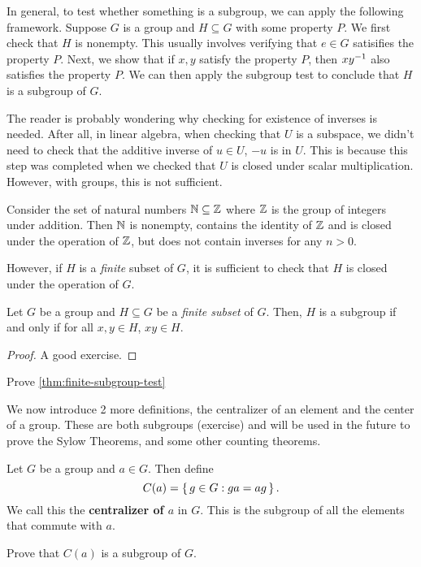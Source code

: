 \documentclass[./main.tex]{subfiles}
\begin{document}
In general, to test whether something is a subgroup, we can apply the following
framework. Suppose $G$ is a group and $H \subseteq G$ with some property $P$. We
first check that $H$ is nonempty. This usually involves verifying that $e \in G$
satisifies the property $P$. Next, we show that if $x, y$ satisfy the property
$P$, then $xy^{-1}$ also satisfies the property $P$. We can then apply the
subgroup test to conclude that $H$ is a subgroup of $G$. 

The reader is probably wondering why checking for existence of inverses is
needed. After all, in linear algebra, when checking that $U$ is a subspace, we
didn't need to check that the additive inverse of $u \in U$, $-u$ is in $U$.
This is because this step was completed when we checked that $U$ is closed under
scalar multiplication. However, with groups, this is not sufficient.

\begin{example}
Consider the set of natural numbers $\mathbb{N} \subseteq \mathbb{Z}$ where $\mathbb{Z}$ is
the group of integers under addition. Then $\mathbb{N}$ is nonempty, contains the
identity of $\mathbb{Z}$ and is closed under the operation of $\mathbb{Z}$, but does not
contain inverses for any $n > 0$.
\end{example}

However, if $H$ is a \emph{finite} subset of $G$, it is sufficient to check that
$H$ is closed under the operation of $G$. 
\begin{theorem}
\label{thm:finite-subgroup-test}
    Let $G$ be a group and $H \subseteq G$ be a \emph{finite subset} of $G$.
    Then, $H$ is a subgroup if and only if for all $x,y \in H$, $xy \in H$.
\end{theorem}
\begin{proof}
    A good exercise.
\end{proof}
\begin{exercise}
    Prove \cref{thm:finite-subgroup-test}
\end{exercise}

We now introduce 2 more definitions, the centralizer of an element and the
center of a group. These are both subgroups (exercise) and will be used in the
future to prove the Sylow Theorems, and some other counting theorems.

\begin{definition}[Centralizer]
    Let $G$ be a group and $a \in G$. Then define 
    \[
        C(a) = \set{g \in G: ga=ag}.
    \]
    We call this the \textbf{centralizer of $a$} in $G$. This is the subgroup of
    all the elements that commute with $a$. 
\end{definition}
\begin{exercise}
    Prove that $C(a)$ is a subgroup of $G$. 
\end{exercise}
\end{document}
